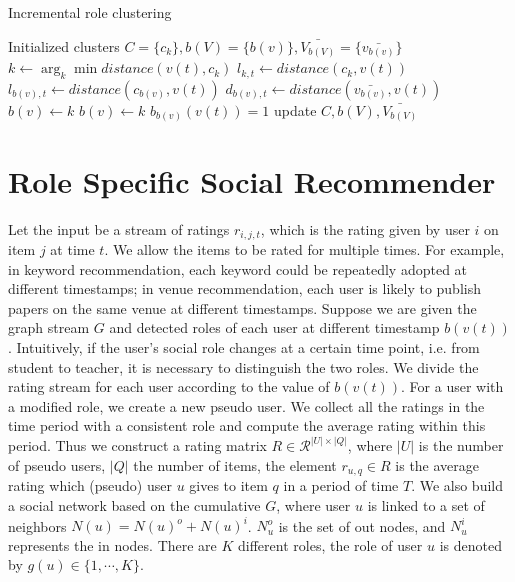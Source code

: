 \documentclass{ieeeaccess}
\begin{document}
\begin{algorithm}[htbp]
\caption{Incremental role clustering}\label{alg:clustering}
\begin{algorithmic}
\REQUIRE Initialized clusters $C=\{c_k\},b(V)=\{b(v)\},\bar{V_{b(V)}}=\{\bar{v_{b(v)}}\}$
\STATE  $k \leftarrow \arg_k \min distance(v(t), c_k)$
\STATE $l_{k,t} \leftarrow distance (c_k,v(t))$
\STATE $l_{b(v),t} \leftarrow distance (c_{b(v)},v(t))$
\STATE $d_{b(v),t} \leftarrow distance (\bar{v_{b(v)}},v(t))$
\STATE $b(v)\leftarrow k$
\ELSE  {}
\STATE $b(v)\leftarrow k$
\ENDIF
\ENDIF
\ENDIF
\STATE $b_{b(v)}(v(t))=1$
\ENDFOR
\STATE update $C,b(V),\bar{V_{b(V)}}$
\ENDWHILE
\end{algorithmic}
\end{algorithm}



\section{Role Specific Social Recommender}\label{sec:model}
Let the input be a stream of ratings $r_{i,j,t}$, which is the rating given by user $i$ on item $j$ at time $t$. We allow the items to be rated for multiple times. For example, in keyword recommendation, each keyword could be repeatedly adopted at different timestamps; in venue recommendation, each user is likely to publish papers on the same venue at different timestamps. Suppose we are given the graph stream $G$ and detected roles of each user at different timestamp $b(v(t))$. Intuitively, if the user's social role changes at a certain time point, i.e. from student to teacher, it is necessary to distinguish the two roles. We divide the rating stream for each user according to the value of $b(v(t))$. For a user with a modified role, we create a new pseudo user. We collect all the ratings in the time period with a consistent role and compute the average rating within this period.  Thus we construct a rating matrix $R\in \mathcal{R}^{|U|\times |Q|}$, where $|U|$ is the number of pseudo users, $|Q|$ the number of items, the element $r_{u,q} \in R$ is the average rating  which (pseudo) user $u$ gives to item $q$ in a period of time $T$.  We also build a social network based on the cumulative $G$, where user $u$ is linked to a set of neighbors $N(u)=N(u)^o + N(u)^i$. $N_u^o$ is the set of out nodes, and $N_u^i$ represents the in nodes. There are $K$ different roles, the role of user $u$ is denoted by $g(u) \in \{1,\cdots, K\}$.
\end{document}
